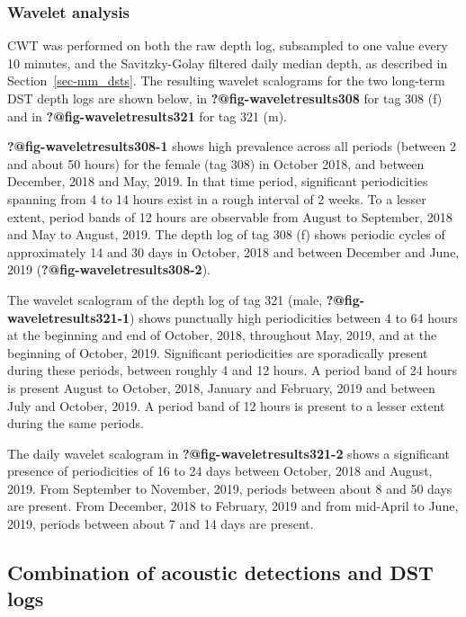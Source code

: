 \documentclass[
  authoryear,
  review,
  3p]{elsarticle}
\begin{document}
\hypertarget{wavelet-analysis}{%
\subsubsection{Wavelet analysis}\label{wavelet-analysis}}

CWT was performed on both the raw depth log, subsampled to one value
every 10 minutes, and the Savitzky-Golay filtered daily median depth, as
described in Section~\ref{sec-mm_dsts}. The resulting wavelet scalograms
for the two long-term DST depth logs are shown below, in
\textbf{?@fig-waveletresults308} for tag 308 (f) and in
\textbf{?@fig-waveletresults321} for tag 321 (m).

\textbf{?@fig-waveletresults308-1} shows high prevalence across all
periods (between 2 and about 50 hours) for the female (tag 308) in
October 2018, and between December, 2018 and May, 2019. In that time
period, significant periodicities spanning from 4 to 14 hours exist in a
rough interval of 2 weeks. To a lesser extent, period bands of 12 hours
are observable from August to September, 2018 and May to August, 2019.
The depth log of tag 308 (f) shows periodic cycles of approximately 14
and 30 days in October, 2018 and between December and June, 2019
(\textbf{?@fig-waveletresults308-2}).

The wavelet scalogram of the depth log of tag 321 (male,
\textbf{?@fig-waveletresults321-1}) shows punctually high periodicities
between 4 to 64 hours at the beginning and end of October, 2018,
throughout May, 2019, and at the beginning of October, 2019. Significant
periodicities are sporadically present during these periods, between
roughly 4 and 12 hours. A period band of 24 hours is present August to
October, 2018, January and February, 2019 and between July and October,
2019. A period band of 12 hours is present to a lesser extent during the
same periods.

The daily wavelet scalogram in \textbf{?@fig-waveletresults321-2} shows
a significant presence of periodicities of 16 to 24 days between
October, 2018 and August, 2019. From September to November, 2019,
periods between about 8 and 50 days are present. From December, 2018 to
February, 2019 and from mid-April to June, 2019, periods between about 7
and 14 days are present.

\newpage{}

\hypertarget{combination-of-acoustic-detections-and-dst-logs}{%
\subsection{Combination of acoustic detections and DST
logs}\label{combination-of-acoustic-detections-and-dst-logs}}
\end{document}
